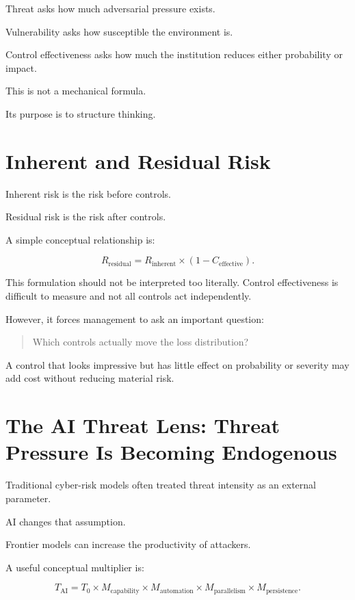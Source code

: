 Threat asks how much adversarial pressure exists.

Vulnerability asks how susceptible the environment is.

Control effectiveness asks how much the institution reduces either probability or impact.

This is not a mechanical formula.

Its purpose is to structure thinking.

\section{Inherent and Residual Risk}

Inherent risk is the risk before controls.

Residual risk is the risk after controls.

A simple conceptual relationship is:

\begin{equation}
R_{\text{residual}}
=
R_{\text{inherent}}
\times
(1 - C_{\text{effective}}).
\end{equation}

This formulation should not be interpreted too literally. Control effectiveness is difficult to measure and not all controls act independently.

However, it forces management to ask an important question:

\begin{quote}
Which controls actually move the loss distribution?
\end{quote}

A control that looks impressive but has little effect on probability or severity may add cost without reducing material risk.

\section{The AI Threat Lens: Threat Pressure Is Becoming Endogenous}

Traditional cyber-risk models often treated threat intensity as an external parameter.

AI changes that assumption.

Frontier models can increase the productivity of attackers.

A useful conceptual multiplier is:

\begin{equation}
T_{\text{AI}}
=
T_0
\times
M_{\text{capability}}
\times
M_{\text{automation}}
\times
M_{\text{parallelism}}
\times
M_{\text{persistence}}.
\end{equation}

